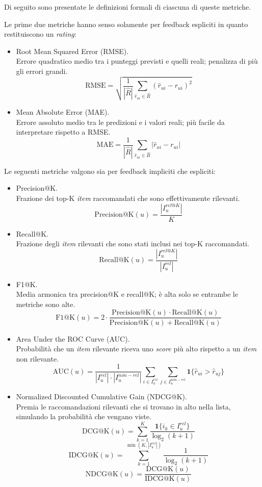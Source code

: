 Di seguito sono presentate le definizioni formali di ciascuna di queste metriche.

Le prime due metriche hanno senso solamente per feedback espliciti in quanto restituiscono un \textit{rating}:

\begin{itemize}
    \item Root Mean Squared Error (RMSE).\\
    Errore quadratico medio tra i punteggi previsti e quelli reali; penalizza di più gli errori grandi.
    \[
    \text{RMSE} = \sqrt{ \frac{1}{|\hat{R}|} \sum_{\hat{r}_{ui} \in \hat{R}} (\hat{r}_{ui} - r_{ui})^2 }
    \]
    
    \item Mean Absolute Error (MAE).\\
    Errore assoluto medio tra le predizioni e i valori reali; più facile da interpretare rispetto a RMSE.
    \[
    \text{MAE} = \frac{1}{|\hat{R}|} \sum_{\hat{r}_{ui} \in \hat{R}} |\hat{r}_{ui} - r_{ui}|
    \]
\end{itemize}   

Le seguenti metriche valgono sia per feedback impliciti che espliciti:

\begin{itemize}
    \item Precision@K.\\
    Frazione dei top-K \textit{item} raccomandati che sono effettivamente rilevanti.
    \[
    \text{Precision@K}(u) = \frac{|I_u^{rel@K}|}{K}
    \]
    
    \item Recall@K.\\
    Frazione degli \textit{item} rilevanti che sono stati inclusi nei top-K raccomandati.
    \[
    \text{Recall@K}(u) = \frac{|I_u^{rel@K}|}{|I_u^{rel}|}
    \]
    
    \item F1@K.\\
    Media armonica tra precision@K e recall@K; è alta solo se entrambe le metriche sono alte.
    \[
    \text{F1@K}(u) = 2 \cdot \frac{\text{Precision@K}(u) \cdot \text{Recall@K}(u)}{\text{Precision@K}(u) + \text{Recall@K}(u)}
    \]
    
    \item Area Under the ROC Curve (AUC).\\
    Probabilità che un \textit{item} rilevante riceva uno \textit{score} più alto rispetto a un \textit{item} non rilevante.
    \[
    \text{AUC}(u) = \frac{1}{|I_u^{rel}| \cdot |I_u^{non-rel}|} \sum_{i \in I_u^{rel}} \sum_{j \in I_u^{non-rel}} \mathbf{1}\{\hat{r}_{ui} > \hat{r}_{uj}\}
    \]
    
    \item Normalized Discounted Cumulative Gain (NDCG@K).\\
    Premia le raccomandazioni rilevanti che si trovano in alto nella lista, simulando la probabilità che vengano viste.
    \[
    \text{DCG@K}(u) = \sum_{k=1}^{K} \frac{\mathbf{1}\{i_k \in I_u^{rel}\}}{\log_2(k + 1)}
    \]
    \[
    \text{IDCG@K}(u) = \sum_{k=1}^{\min(K, |I_u^{rel}|)} \frac{1}{\log_2(k + 1)}
    \]
    \[
    \text{NDCG@K}(u) = \frac{\text{DCG@K}(u)}{\text{IDCG@K}(u)}
    \]
\end{itemize}